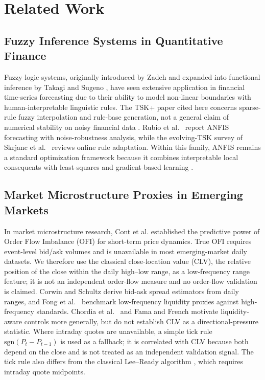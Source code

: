 \documentclass[pdflatex,sn-mathphys-num]{sn-jnl}
\theoremstyle{thmstyleone}
\theoremstyle{thmstyletwo}
\theoremstyle{thmstylethree}
\begin{document}
\section{Related Work}\label{sec2}

\subsection{Fuzzy Inference Systems in Quantitative Finance}

Fuzzy logic systems, originally introduced by Zadeh \cite{zadeh1965} and expanded into functional inference by Takagi and Sugeno \cite{takagi1985}, have seen extensive application in financial time-series forecasting due to their ability to model non-linear boundaries with human-interpretable linguistic rules. The TSK+ paper cited here concerns sparse-rule fuzzy interpolation and rule-base generation, not a general claim of numerical stability on noisy financial data \cite{li2018}. Rubio et al.\ \cite{rubio2021} report ANFIS forecasting with noise-robustness analysis, while the evolving-TSK survey of Skrjanc et al.\ \cite{skrjanc2019} reviews online rule adaptation. Within this family, ANFIS remains a standard optimization framework because it combines interpretable local consequents with least-squares and gradient-based learning \cite{jang1993}.

\subsection{Market Microstructure Proxies in Emerging Markets}

In market microstructure research, Cont et al. \cite{cont2014} established the predictive power of Order Flow Imbalance ($\mathrm{OFI}$) for short-term price dynamics. True $\mathrm{OFI}$ requires event-level bid/ask volumes and is unavailable in most emerging-market daily datasets. We therefore use the classical close-location value (CLV), the relative position of the close within the daily high--low range, as a low-frequency range feature; it is not an independent order-flow measure and no order-flow validation is claimed. Corwin and Schultz \cite{corwin2012} derive bid-ask spread estimators from daily ranges, and Fong et al.\ \cite{fong2017} benchmark low-frequency liquidity proxies against high-frequency standards. Chordia et al.\ \cite{chordia2001} and Fama and French \cite{fama2008} motivate liquidity-aware controls more generally, but do not establish CLV as a directional-pressure statistic. Where intraday quotes are unavailable, a simple tick rule $\mathrm{sgn}(P_t - P_{t-1})$ is used as a fallback; it is correlated with CLV because both depend on the close and is not treated as an independent validation signal. The tick rule also differs from the classical Lee--Ready algorithm \cite{leeready1991}, which requires intraday quote midpoints.
\end{document}
